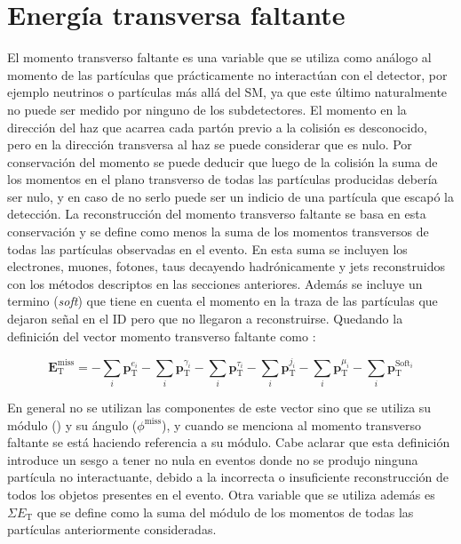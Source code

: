 \section{Energía transversa faltante}


El momento transverso faltante es una variable que se utiliza como análogo al momento de las partículas que prácticamente no interactúan con el detector, por ejemplo neutrinos o partículas más allá del SM, ya que este último naturalmente no puede ser medido por ninguno de los subdetectores. El momento en la dirección del haz que acarrea cada partón previo a la colisión es desconocido, pero en la dirección transversa al haz se puede considerar que es nulo. Por conservación del momento se puede deducir que luego de la colisión la suma de los momentos en el plano transverso de todas las partículas producidas debería ser nulo, y en caso de no serlo puede ser un indicio de una partícula que escapó la detección. La reconstrucción del momento transverso faltante se basa en esta conservación y se define como menos la suma de los momentos transversos de todas las partículas observadas en el evento. En esta suma se incluyen los electrones, muones, fotones, taus decayendo hadrónicamente y jets reconstruidos con los métodos descriptos en las secciones anteriores. Además se incluye un termino (\textit{soft}) que tiene en cuenta el momento en la traza de las partículas que dejaron señal en el ID pero que no llegaron a reconstruirse. Quedando la definición del vector momento transverso faltante como \cite{PERF-2016-07}:

\begin{equation}
\textbf{E}_{\text{T}}^{\text{miss}} = -\sum_{i}\textbf{p}_{\text{T}}^{e_i}-\sum_{i}\textbf{p}_{\text{T}}^{\gamma_i}-\sum_{i}\textbf{p}_{\text{T}}^{\tau_i}-\sum_{i}\textbf{p}_{\text{T}}^{j_i}-\sum_{i}\textbf{p}_{\text{T}}^{\mu_i}-\sum_{i}\textbf{p}_{\text{T}}^{\text{Soft}_i}
\end{equation}


En general no se utilizan las componentes de este vector sino que se utiliza su módulo (\met) y su ángulo ($\phi^{\text{miss}}$), y cuando se menciona al momento transverso faltante se está haciendo referencia a su módulo. Cabe aclarar que esta definición introduce un sesgo a tener \met no nula en eventos donde no se produjo ninguna partícula no interactuante, debido a la incorrecta o insuficiente reconstrucción de todos los objetos presentes en el evento. Otra variable que se utiliza además es $\Sigma E_{\text{T}}$ que se define como la suma del módulo de los momentos de todas las partículas anteriormente consideradas. 

